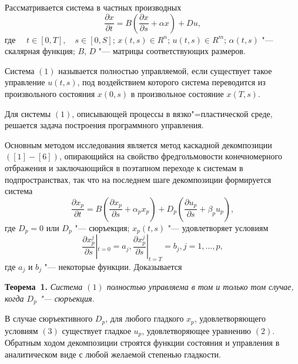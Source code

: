 \vzmscaption

 Рассматривается система в частных производных
\begin{equation}
\frac{\partial x}{\partial t}=B(\frac{\partial x}{\partial s}+ \alpha x) + Du,
\end{equation}
 где $\quad t\in [0,T],\quad s\in [0,S]$; $x(t,s)\in R ^{n}$; $u(t,s)\in R^{m}$; $\alpha(t,s)$ "--- скалярная функция; $B$, $D$ "--- матрицы соответствующих размеров.

Система $(1)$ называется полностью управляемой, если существует такое управление $u(t,s)$,
под воздействием которого система переводится  из произвольного состояния $x(0,s)$ в произвольное состояние $x(T,s)$.

Для системы $(1)$, описывающей процессы в вязко"=пластической среде, решается задача построения программного управления.


Основным методом исследования является метод каскадной декомпозиции $([1]-[6])$, опирающийся на свойство фредгольмовости конечномерного отбражения и заключающийся в поэтапном переходе к системам в подпространствах, так что на
последнем шаге декомпозиции формируется система
\begin{equation}
\frac{\partial x_{p}}{\partial t}=B(\frac{\partial x_{p}}{\partial s}+ \alpha_{p} x_{p}) + D_{p}(\frac{\partial u_{p}}{\partial s}+ \beta_{p} u_{p}),
\end{equation}
где $D_{p}=0$ или $D_{p}$ "--- сюръекция; $x_{p}(t,s)$ "--- удовлетворяет условиям
\begin{equation}
\frac{\partial x^{j}_{p}}{\partial s}|_{t=0} = a_{j}, \frac{\partial x^{j}_{p}}{\partial s}|_{t=T} = b_{j}, j=1,...,p,
\end{equation}
где $a_{j}$ и $b_{j}$ "--- некоторые функции. Доказывается

\textbf{Теорема~1.} {\it Система $(1)$ полностью управляема в том и только том случае, когда $D_{p}$ "--- сюръекция.}


В случае сюръективного $D_{p}$, для любого гладкого $x_{p}$, удовлетворяющего
условиям $(3)$ существует гладкое $u_{p}$, удовлетворяющее уравнению $(2)$. Обратным ходом декомпозиции строятся функции состояния
и управления в аналитическом виде  с любой желаемой степенью гладкости.

\litlist


